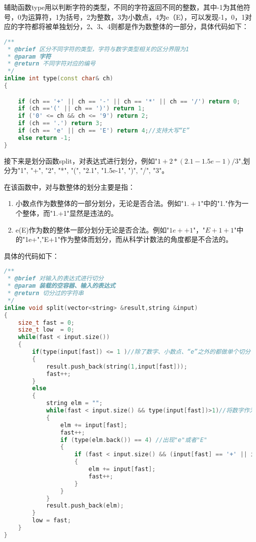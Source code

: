 \documentclass[fontset=fandol]{ctexart}
\begin{document}
辅助函数type用以判断字符的类型，不同的字符返回不同的整数，其中-1为其他符号，0为运算符，1为括号，2为整数，3为小数点，4为e（E），可以发现-1，0，1对应的字符都将被单独划分，2、3、4则都是作为数整体的一部分，具体代码如下：
\begin{lstlisting}[language=C++,caption={type()}]
/**
 * @brief 区分不同字符的类型，字符与数字类型相关的区分界限为1
 * @param 字符
 * @return 不同字符对应的编号
 */
inline int type(const char& ch)
{

    if (ch == '+' || ch == '-' || ch == '*' || ch == '/') return 0;
    if (ch =='(' || ch == ')') return 1;
    if ('0' <= ch && ch <= '9') return 2;
    if (ch == '.') return 3;
    if (ch == 'e' || ch == 'E') return 4;//支持大写“E”
    else return -1;
}
\end{lstlisting}

接下来是划分函数split，对表达式进行划分，例如"$1+2*(2.1-1.5e-1)/3$",划分为"1", "+", "2", "*", "(", "2.1", "1.5e-1", ")", "/", "3"。

在该函数中，对与数整体的划分主要是指：
\begin{enumerate}
    \item 小数点作为数整体的一部分划分，无论是否合法。例如"$1.+1$"中的"1."作为一个整体，而"1.+1"显然是违法的。
    \item e(E)作为数的整体一部分划分无论是否合法。例如"$1e++1$"，"$E+1+1$"中的"1e+","E+1"作为整体而划分，而从科学计数法的角度都是不合法的。
\end{enumerate}

具体的代码如下：

\begin{lstlisting}[language=C++,caption={split()}]
/**
 * @brief 对输入的表达式进行切分
 * @param 装载的空容器、输入的表达式
 * @return 切分过的字符串
 */
inline void split(vector<string> &result,string &input)
{
    size_t fast = 0;
    size_t low  = 0;
    while(fast < input.size())
    {
        if(type(input[fast]) <= 1 )//除了数字、小数点、“e”之外的都做单个切分
        {
            result.push_back(string(1,input[fast]));
            fast++;
        }
        else 
        {
            string elm = "";
            while(fast < input.size() && type(input[fast])>1)//将数字作为一个整体放入容器内
            {
                elm += input[fast];
                fast++;
                if (type(elm.back()) == 4) //出现"e"或者"E"
                {
                    if (fast < input.size() && (input[fast] == '+' || input[fast] == '-')) 
                    {
                        elm += input[fast];
                        fast++;
                    }
                }
            }
            result.push_back(elm);
        }
        low = fast;
    }
}    
\end{lstlisting}
\end{document}
